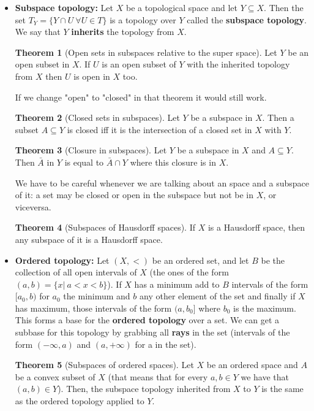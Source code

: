 \documentclass[a4paper]{book}
\theoremstyle{definition}
\newtheorem{theorem}{Theorem}[section]
\theoremstyle{ejemplo}
\theoremstyle{demostracion}
\begin{document}
\begin{itemize}
\item
\textbf{Subspace topology: }Let $X$ be a topological space and let $Y\subseteq X$. Then the set $T_{Y}=\{Y\cap U\ \forall U\in T \}$ is a topology over $Y$ called the \textbf{subspace topology}. We say that $Y$ \textbf{inherits} the topology from $X$.

\begin{theorem}[Open sets in subspaces relative to the super space]
Let $Y$ be an open subset in $X$. If $U$ is an open subset of $Y$ with the inherited topology from $X$ then $U$ is open in $X$ too.
\end{theorem}
If we change "open" to "closed" in that theorem it would still work.

\begin{theorem}[Closed sets in subspaces]
Let $Y$ be a subspace in $X$. Then a subset $A\subseteq Y$ is closed iff it is the intersection of a closed set in $X$ with $Y$.
\end{theorem}

\begin{theorem}[Closure in subspaces]
Let $Y$ be a subspace in $X$ and $A\subseteq Y$. Then $\bar{A}$ in $Y$ is equal to $\bar{A}\cap Y$ where this closure is in $X$.
\end{theorem}
We have to be careful whenever we are talking about an space and a subspace of it: a set may be closed or open in the subspace but not be in $X$, or viceversa.

\begin{theorem}[Subspaces of Hausdorff spaces]
If $X$ is a Hausdorff space, then any subspace of it is a Hausdorff space.
\end{theorem}

\item
\textbf{Ordered topology: }Let $(X, <)$ be an ordered set, and let $B$ be the collection of all open intervals of $X$ (the ones of the form $(a, b)= \{x|\ a<x<b\}$). If $X$ has a minimum add to $B$ intervals of the form $[a_{0}, b)$ for $a_{0}$ the minimum and $b$ any other element of the set and finally if $X$ has maximum, those intervals of the form $(a, b_{0}]$ where $b_{0}$ is the maximum. This forms a base for the \textbf{ordered topology} over a set. We can get a subbase for this topology by grabbing all \textbf{rays} in the set (intervals of the form $(-\infty, a)$ and $(a, +\infty)$ for a in the set).

\begin{theorem}[Subspaces of ordered spaces]
Let $X$ be an ordered space and $A$ be a convex subset of $X$ (that means that for every $a,b\in Y$ we have that $(a,b)\in Y$). Then, the subspace topology inherited from $X$ to $Y$ is the same as the ordered topology applied to $Y$.
\end{theorem}


\end{itemize}
\end{document}
